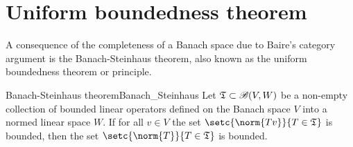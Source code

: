 \section{Uniform boundedness theorem}
A consequence of the completeness of a Banach space due to Baire's category argument is the Banach-Steinhaus theorem, also known as the uniform boundedness theorem or principle. %
\begin{theorem}{Banach-Steinhaus theorem}{Banach_Steinhaus}
    Let \(\mathfrak{T} \subset \mathscr{B}{(V,W)}\) be a non-empty collection of bounded linear operators defined on the Banach space \(V\) into a normed linear space \(W\). If for all \(v \in V\) the set \(\setc{\norm{Tv}}{T \in \mathfrak{T}}\) is bounded, then the set \(\setc{\norm{T}}{T \in \mathfrak{T}}\) is bounded.
\end{theorem}
